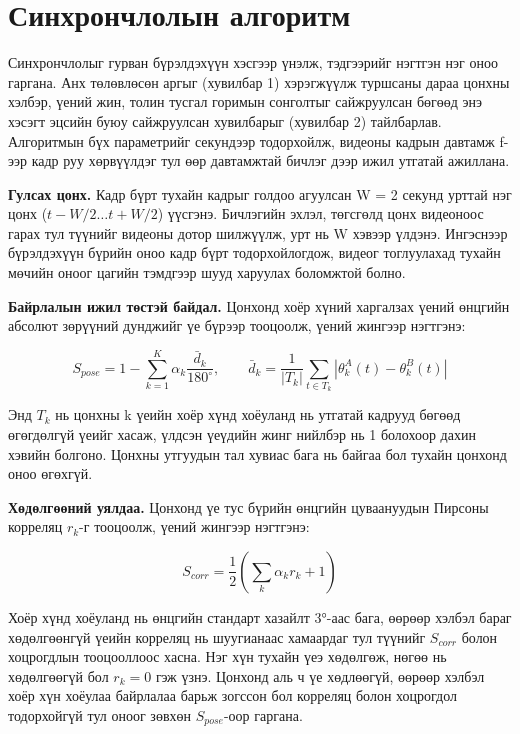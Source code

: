 \section{Синхрончлолын алгоритм}

Синхрончлолыг гурван бүрэлдэхүүн хэсгээр үнэлж, тэдгээрийг нэгтгэн нэг оноо гаргана. Анх төлөвлөсөн аргыг (хувилбар 1) хэрэгжүүлж туршсаны дараа цонхны хэлбэр, үений жин, толин тусгал горимын сонголтыг сайжруулсан бөгөөд энэ хэсэгт эцсийн буюу сайжруулсан хувилбарыг (хувилбар 2) тайлбарлав. Алгоритмын бүх параметрийг секундээр тодорхойлж, видеоны кадрын давтамж f-ээр кадр руу хөрвүүлдэг тул өөр давтамжтай бичлэг дээр ижил утгатай ажиллана.

\textbf{Гулсах цонх.} Кадр бүрт тухайн кадрыг голдоо агуулсан W = 2 секунд урттай нэг цонх (\(t - W/2 \ldots t + W/2\)) үүсгэнэ. Бичлэгийн эхлэл, төгсгөлд цонх видеоноос гарах тул түүнийг видеоны дотор шилжүүлж, урт нь W хэвээр үлдэнэ. Ингэснээр бүрэлдэхүүн бүрийн оноо кадр бүрт тодорхойлогдож, видеог тоглуулахад тухайн мөчийн оноог цагийн тэмдгээр шууд харуулах боломжтой болно.

\textbf{Байрлалын ижил төстэй байдал.} Цонхонд хоёр хүний харгалзах үений өнцгийн абсолют зөрүүний дунджийг үе бүрээр тооцоолж, үений жингээр нэгтгэнэ:

\begin{equation}
S_{pose} = 1 - \sum_{k=1}^{K} \alpha_k \frac{\bar{d}_k}{180^{\circ}}, \qquad \bar{d}_k = \frac{1}{|T_k|} \sum_{t \in T_k} \left| \theta^{A}_{k}(t) - \theta^{B}_{k}(t) \right|
\end{equation}

Энд \(T_k\) нь цонхны k үеийн хоёр хүнд хоёуланд нь утгатай кадрууд бөгөөд өгөгдөлгүй үеийг хасаж, үлдсэн үеүдийн жинг нийлбэр нь 1 болохоор дахин хэвийн болгоно. Цонхны утгуудын тал хувиас бага нь байгаа бол тухайн цонхонд оноо өгөхгүй.

\textbf{Хөдөлгөөний уялдаа.} Цонхонд үе тус бүрийн өнцгийн цуваануудын Пирсоны корреляц \(r_k\)-г тооцоолж, үений жингээр нэгтгэнэ:

\begin{equation}
S_{corr} = \frac{1}{2} \left( \sum_{k} \alpha_k r_k + 1 \right)
\end{equation}

Хоёр хүнд хоёуланд нь өнцгийн стандарт хазайлт 3°-аас бага, өөрөөр хэлбэл бараг хөдөлгөөнгүй үеийн корреляц нь шуугианаас хамаардаг тул түүнийг \(S_{corr}\) болон хоцрогдлын тооцооллоос хасна. Нэг хүн тухайн үеэ хөдөлгөж, нөгөө нь хөдөлгөөгүй бол \(r_k = 0\) гэж үзнэ. Цонхонд аль ч үе хөдлөөгүй, өөрөөр хэлбэл хоёр хүн хоёулаа байрлалаа барьж зогссон бол корреляц болон хоцрогдол тодорхойгүй тул оноог зөвхөн \(S_{pose}\)-оор гаргана.

